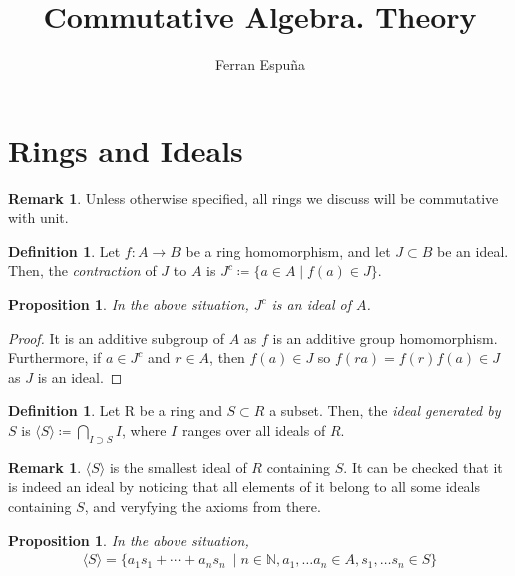 \documentclass[11pt]{article}
\title{Commutative Algebra. Theory}
\author{Ferran Espuña}
\newtheorem{prop}[theorem]{Proposition}
\theoremstyle{definition}
\newtheorem{defn}[theorem]{Definition}
\newtheorem{rk}[theorem]{Remark}
\begin{document}
    \maketitle

    \section{Rings and Ideals}\label{sec:rings-and-ideals}

        \begin{rk}
            Unless otherwise specified, all rings we discuss will be commutative with unit.
        \end{rk}


        \begin{defn}
            Let $f: A \rightarrow B$ be a ring homomorphism, and let $J \subset B$ be an ideal.
            Then, the \emph{contraction} of $J$ to $A$ is $J^{c} \coloneqq \{a \in A \mid f(a) \in J\}$.
        \end{defn}

        \begin{prop}
            In the above situation, $J^{c}$ is an ideal of $A$.
        \end{prop}

            \begin{proof}
                It is an additive subgroup of $A$ as $f$ is an additive group homomorphism.
                Furthermore, if $a \in J^{c}$ and $r \in A$, then $f(a) \in J$ so $f(ra) = f(r)f(a) \in J$ as $J$ is an ideal.
            \end{proof}

        \begin{defn}
            Let R be a ring and $S \subset R$ a subset.
            Then, the \emph{ideal generated by} $S$ is $\langle S \rangle \coloneqq \bigcap_{I \supset S} I$, where $I$ ranges over all ideals of $R$.
        \end{defn}

        \begin{rk}
            $\langle S \rangle$ is the smallest ideal of $R$ containing $S$.
            It can be checked that it is indeed an ideal by noticing that all elements of it belong to all some ideals containing $S$,
            and veryfying the axioms from there.
        \end{rk}

        \begin{prop}
            In the above situation,
            \begin{align}
                \langle S \rangle = \{a_1 s_1 + \cdots + a_n s_n\ \mid n \in \mathbb{N}, a_1, \ldots a_n \in A, s_1, \ldots s_n \in S\} \nonumber
            \end{align}
        \end{prop}
\end{document}
